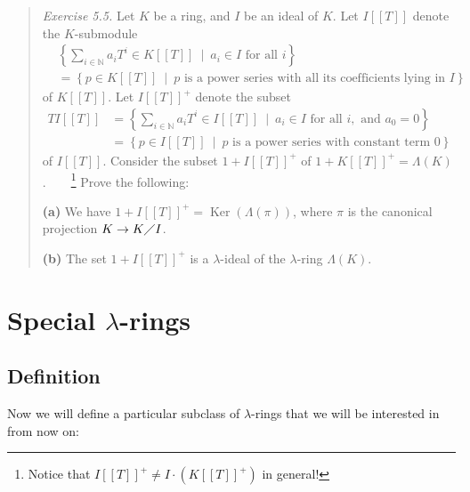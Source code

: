 \documentclass[numbers=enddot,12pt,final,onecolumn,notitlepage]{scrartcl}%
\begin{document}
\begin{quotation}
\textit{Exercise 5.5.} Let $K$ be a ring, and $I$ be an ideal of $K$. Let
$I\left[  \left[  T\right]  \right]  $ denote the $K$-submodule%
\begin{align*}
&  \left\{  \sum_{i\in\mathbb{N}}a_{i}T^{i}\in K\left[  \left[  T\right]
\right]  \ \mid\ a_{i}\in I\text{ for all }i\right\} \\
&  =\left\{  p\in K\left[  \left[  T\right]  \right]  \ \mid\ p\text{ is a
power series with all its coefficients lying in }I\right\}
\end{align*}
of $K\left[  \left[  T\right]  \right]  $. Let $I\left[  \left[  T\right]
\right]  ^{+}$ denote the subset%
\begin{align*}
TI\left[  \left[  T\right]  \right]   &  =\left\{  \sum_{i\in\mathbb{N}}%
a_{i}T^{i}\in I\left[  \left[  T\right]  \right]  \ \mid\ a_{i}\in I\text{ for
all }i,\text{ and }a_{0}=0\right\} \\
&  =\left\{  p\in I\left[  \left[  T\right]  \right]  \ \mid\ p\text{ is a
power series with constant term }0\right\}
\end{align*}
of $I\left[  \left[  T\right]  \right]  $. Consider the subset $1+I\left[
\left[  T\right]  \right]  ^{+}$ of $1+K\left[  \left[  T\right]  \right]
^{+}=\Lambda\left(  K\right)  $.\ \ \ \ \footnote{Notice that $I\left[
\left[  T\right]  \right]  ^{+}\neq I\cdot\left(  K\left[  \left[  T\right]
\right]  ^{+}\right)  $ in general!} Prove the following:

\textbf{(a)} We have $1+I\left[  \left[  T\right]  \right]  ^{+}%
=\operatorname*{Ker}\left(  \Lambda\left(  \pi\right)  \right)  $, where $\pi$
is the canonical projection $K\rightarrow K\diagup I$.

\textbf{(b)} The set $1+I\left[  \left[  T\right]  \right]  ^{+}$ is a
$\lambda$-ideal of the $\lambda$-ring $\Lambda\left(  K\right)  $.
\end{quotation}

\section{Special $\lambda$-rings}

\subsection{Definition}

Now we will define a particular subclass of $\lambda$-rings that we will be
interested in from now on:
\end{document}
